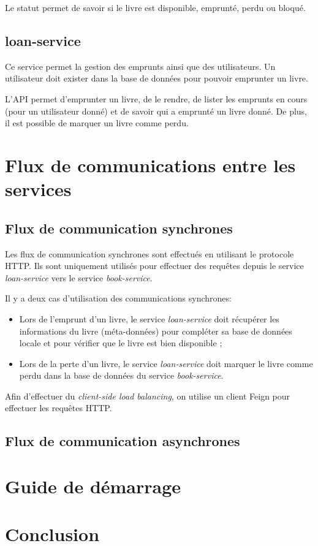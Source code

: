 \documentclass[
  french,
  a4paper,
]{scrartcl}
\begin{document}
Le statut permet de savoir si le livre est disponible, emprunté, perdu ou bloqué. 


\subsection{loan-service}

Ce service permet la gestion des emprunts ainsi que des utilisateurs. 
Un utilisateur doit exister dans la base de données pour pouvoir emprunter un livre. 

L'API permet d'emprunter un livre, de le rendre, de lister les emprunts en cours (pour un utilisateur donné)
et de savoir qui a emprunté un livre donné. De plus, il est possible de marquer un livre comme perdu. 


\section{Flux de communications entre les services}

\subsection{Flux de communication synchrones}

Les flux de communication synchrones sont effectués en utilisant le protocole HTTP. Ils sont 
uniquement utilisés pour effectuer des requêtes depuis le service \textit{loan-service} vers le service
\textit{book-service}. 

Il y a deux cas d'utilisation des communications synchrones:

\begin{itemize}
  \item Lors de l'emprunt d'un livre, le service \textit{loan-service} doit récupérer 
    les informations du livre (méta-données) pour compléter sa base de données locale et pour 
    vérifier que le livre est bien disponible ; 

  \item Lors de la perte d'un livre, le service \textit{loan-service} doit marquer le livre
    comme perdu dans la base de données du service \textit{book-service}.
\end{itemize}

Afin d'effectuer du \textit{client-side load balancing}, on utilise un client Feign pour effectuer
les requêtes HTTP.

\subsection{Flux de communication asynchrones}

\section{Guide de démarrage}

\section{Conclusion}
 
\end{document}

